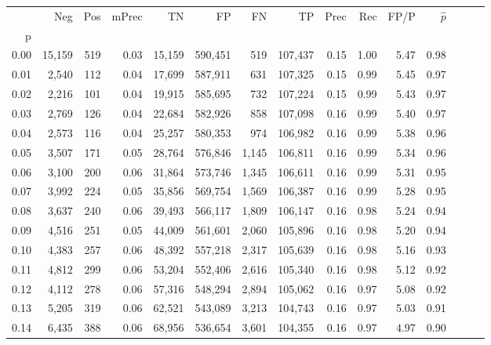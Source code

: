 \begin{tabular}{rrrrrrrrrrrrrrr}
\toprule
{} &     Neg &    Pos & mPrec &       TN &       FP &       FN &       TP &  Prec &   Rec &  FP/P & $\hat{p}$ \\
p    &         &        &       &          &          &          &          &       &       &       &           \\
\midrule
0.00 &  15,159 &    519 &  0.03 &   15,159 &  590,451 &      519 &  107,437 &  0.15 &  1.00 &  5.47 &      0.98 \\
0.01 &   2,540 &    112 &  0.04 &   17,699 &  587,911 &      631 &  107,325 &  0.15 &  0.99 &  5.45 &      0.97 \\
0.02 &   2,216 &    101 &  0.04 &   19,915 &  585,695 &      732 &  107,224 &  0.15 &  0.99 &  5.43 &      0.97 \\
0.03 &   2,769 &    126 &  0.04 &   22,684 &  582,926 &      858 &  107,098 &  0.16 &  0.99 &  5.40 &      0.97 \\
0.04 &   2,573 &    116 &  0.04 &   25,257 &  580,353 &      974 &  106,982 &  0.16 &  0.99 &  5.38 &      0.96 \\
0.05 &   3,507 &    171 &  0.05 &   28,764 &  576,846 &    1,145 &  106,811 &  0.16 &  0.99 &  5.34 &      0.96 \\
0.06 &   3,100 &    200 &  0.06 &   31,864 &  573,746 &    1,345 &  106,611 &  0.16 &  0.99 &  5.31 &      0.95 \\
0.07 &   3,992 &    224 &  0.05 &   35,856 &  569,754 &    1,569 &  106,387 &  0.16 &  0.99 &  5.28 &      0.95 \\
0.08 &   3,637 &    240 &  0.06 &   39,493 &  566,117 &    1,809 &  106,147 &  0.16 &  0.98 &  5.24 &      0.94 \\
0.09 &   4,516 &    251 &  0.05 &   44,009 &  561,601 &    2,060 &  105,896 &  0.16 &  0.98 &  5.20 &      0.94 \\
0.10 &   4,383 &    257 &  0.06 &   48,392 &  557,218 &    2,317 &  105,639 &  0.16 &  0.98 &  5.16 &      0.93 \\
0.11 &   4,812 &    299 &  0.06 &   53,204 &  552,406 &    2,616 &  105,340 &  0.16 &  0.98 &  5.12 &      0.92 \\
0.12 &   4,112 &    278 &  0.06 &   57,316 &  548,294 &    2,894 &  105,062 &  0.16 &  0.97 &  5.08 &      0.92 \\
0.13 &   5,205 &    319 &  0.06 &   62,521 &  543,089 &    3,213 &  104,743 &  0.16 &  0.97 &  5.03 &      0.91 \\
0.14 &   6,435 &    388 &  0.06 &   68,956 &  536,654 &    3,601 &  104,355 &  0.16 &  0.97 &  4.97 &      0.90 \\

\end{tabular}
